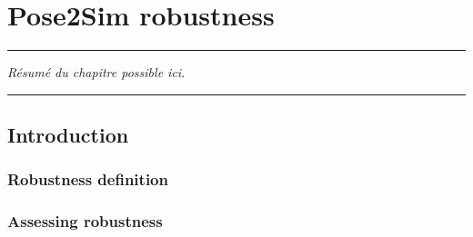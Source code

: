 
\lhead[\fancyplain{}{\leftmark}]%
      {\fancyplain{}{}} %
\chead[\fancyplain{}{}]%
      {\fancyplain{}{}}
\rhead[\fancyplain{}{}]%
      {\fancyplain{}{\rightmark}}%
\lfoot[\fancyplain{}{}]%
      {\fancyplain{}{}}
\cfoot[\fancyplain{}{\thepage}]%
      {\fancyplain{}{\thepage}} %
\rfoot[\fancyplain{}{}]%
     {\fancyplain{}{\scriptsize}}



\chapter{Pose2Sim robustness}
\label{ch:4}


\begin{center}
\rule{0.7\linewidth}{.5pt}
\begin{minipage}{0.7\linewidth}
\smallskip

\textit{Résumé du chapitre possible ici.
}

\end{minipage}
\smallskip
\rule{0.7\linewidth}{.5pt}
\end{center}

\minitoc
\newpage


\section{Introduction}
\subsection{Robustness definition}
\blindtext

\subsection{Assessing robustness}
\blindtext



